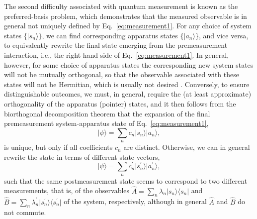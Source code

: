 \documentclass[twocolumn,rmp,aps,amsmath,amsfonts,noshowkeys,noshowpacs]{revtex4}
\newcommand{\ket}[1]{\ensuremath{|{#1\rangle}}}
\newcommand{\bra}[1]{\ensuremath{{\langle #1}|}}
\begin{document}
The second difficulty associated with quantum measurement is known as
the preferred-basis problem, which demonstrates that the measured
observable is in general not uniquely defined by
Eq.~\eqref{eq:measurement1}. For any choice of system states $\{
\ket{s_n} \}$, we can find corresponding apparatus states $\{
\ket{a_n} \}$, and vice versa, to equivalently rewrite the final state
emerging from the premeasurement interaction, i.e., the right-hand
side of Eq.~\eqref{eq:measurement1}.  In general, however, for some
choice of apparatus states the corresponding new system states will
not be mutually orthogonal, so that the observable associated with
these states will not be Hermitian, which is usually not desired
\citep[however, not forbidden---see the discussion
by][]{Zurek:2002:ii}.  Conversely, to ensure distinguishable outcomes,
we must, in general, require the (at least approximate) orthogonality
of the apparatus (pointer) states, and it then follows from the
biorthogonal decomposition theorem that the expansion of the final
premeasurement system-apparatus state of Eq.~\eqref{eq:measurement1},
%
\begin{equation}
\ket{\psi} = \sum_n c_n \ket{s_n}
\ket{a_n}, 
\end{equation}
%
is unique, but only if all coefficients $c_n$ are distinct. Otherwise, we
can in general rewrite the state in terms of different state vectors,
%
\begin{equation} 
\ket{\psi} = \sum_n c_n^\prime \ket{s^\prime_n}
\ket{a^\prime_n}, 
\end{equation}
%
such that the same postmeasurement state seems to correspond to two
different measurements, that is, of the observables $\widehat{A} =
\sum_n \lambda_n \ket{s_n} \bra{s_n}$ and
$\widehat{B} = \sum_n \lambda_n^\prime \ket{s^\prime_n}
\bra{s^\prime_n}$ of the system, respectively,
although in general $\widehat{A}$ and $\widehat{B}$ do not
commute.
\end{document}
